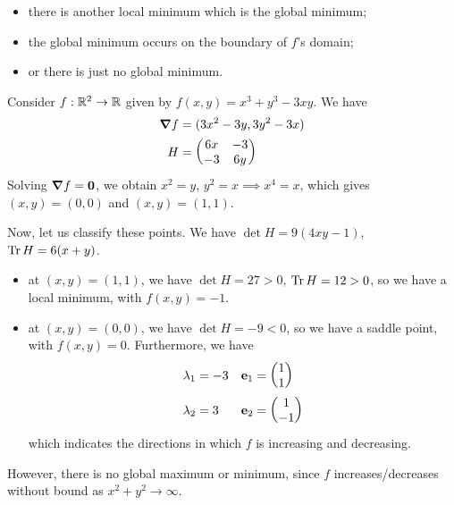 \documentclass{../../template/note}
\begin{document}
    \begin{itemize}
        \item there is another local minimum which is the global minimum;
        \item the global minimum occurs on the boundary of $f$'s domain;
        \item or there is just no global minimum.
    \end{itemize}
    
    \begin{example*}
        Consider $f: \mathbb R^2 \to \mathbb R$ given by $f(x, y) = x^3 + y^3 - 3xy$. We have
        \begin{align*}
            \grad f &= (3x^2 - 3y, 3y^2 - 3x) \\
            H &= \begin{pmatrix}
                6x & -3 \\
                -3 & 6y \\
            \end{pmatrix}
        \end{align*}
        Solving $\grad f = \V 0$, we obtain $x^2 = y$, $y^2 = x \implies x^4 = x$, which gives $(x, y) = (0, 0)$ and $(x, y) = (1, 1)$.

        Now, let us classify these points. We have $\det H = 9(4xy-1)$, $\operatorname{Tr} H = 6(x+y)$.

        \begin{itemize}
            \item at $(x, y) = (1, 1)$, we have $\det H = 27 > 0$, $\operatorname{Tr} H = 12 > 0$, so we have a local minimum, with $f(x, y) = -1$.
            \item at $(x, y) = (0, 0)$, we have $\det H = -9 < 0$, so we have a saddle point, with $f(x, y) = 0$. Furthermore, we have
            \begin{align*}
                \lambda_1 &= -3 && \V e_1 = \begin{pmatrix}
                    1 \\
                    1 \\
                \end{pmatrix} \\
                \lambda_2 &= 3 && \V e_2 = \begin{pmatrix}
                    1 \\
                    -1 \\
                \end{pmatrix}
            \end{align*}
            which indicates the directions in which $f$ is increasing and decreasing.
        \end{itemize}
        However, there is no global maximum or minimum, since $f$ increases/decreases without bound as $x^2+y^2 \to \infty$.
    \end{example*}
    
\end{document}
